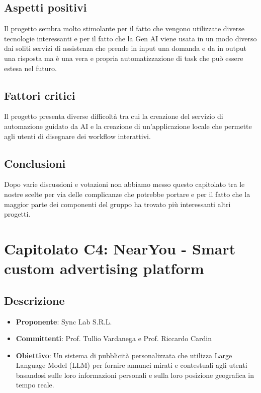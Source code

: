 \documentclass[italian, 12pt]{article}
\begin{document}
\subsection{Aspetti positivi}
Il progetto sembra molto stimolante per il fatto che vengono utilizzate diverse tecnologie interessanti e per il fatto che la Gen AI viene usata in un modo diverso dai soliti servizi di assistenza che prende in input una domanda e da in output una risposta ma è una vera e propria automatizzazione di task che può essere estesa nel futuro.

\subsection{Fattori critici}
Il progetto presenta diverse difficoltà tra cui la creazione del servizio di automazione guidato da AI e la creazione di un'applicazione locale che permette agli utenti di disegnare dei workflow interattivi.

\subsection{Conclusioni}
Dopo varie discussioni e votazioni non abbiamo messo questo capitolato tra le nostre scelte per via delle complicanze che potrebbe portare e per il fatto che la maggior parte dei componenti del gruppo ha trovato più interessanti altri progetti.

\section{Capitolato C4: NearYou - Smart custom advertising platform}
\subsection{Descrizione}
\begin{itemize}
\item\textbf{Proponente}: Sync Lab S.R.L.
\item\textbf{Committenti}: Prof. Tullio Vardanega e Prof. Riccardo Cardin
\item\textbf{Obiettivo}: Un sistema di pubblicità personalizzata che utilizza Large Language Model (LLM) per fornire annunci mirati e contestuali agli utenti basandosi sulle loro informazioni personali e sulla loro posizione geografica in tempo reale.
\end{itemize}
\end{document}
